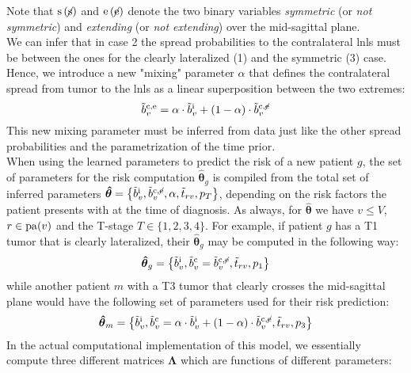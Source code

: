 \documentclass[\relativeRoot/main.tex]{subfiles}
\begin{document}
Note that $\text{s} \, (\centernot{\text{s}})$ and $\text{e} \, (\centernot{\text{e}})$ denote the two binary variables \emph{symmetric} (or \emph{not symmetric}) and \emph{extending} (or \emph{not extending}) over the mid-sagittal plane. \\
We can infer that in case 2 the spread probabilities to the contralateral \glspl{lnl} must be between the ones for the clearly lateralized (1) and the symmetric (3) case. Hence, we introduce a new "mixing" parameter $\alpha$ that defines the contralateral spread from tumor to the \glspl{lnl} as a linear superposition between the two extremes:
%
\begin{equation}
    \Tilde{b}_v^{\text{c} , \text{e}} = \alpha \cdot \Tilde{b}_v^\text{i} + (1 - \alpha) \cdot \Tilde{b}_v^{\text{c} , \centernot{\text{e}}}
\end{equation}
%
This new mixing parameter must be inferred from data just like the other spread probabilities and the parametrization of the time prior. \\
When using the learned parameters to predict the risk of a new patient $g$, the set of parameters for the risk computation $\boldsymbol{\hat{\theta}}_g$ is compiled from the total set of inferred parameters $\boldsymbol{\hat{\theta}} = \big\{ \Tilde{b}_v^\text{i} , \Tilde{b}_v^{\text{c} , \centernot{\text{e}}} , \alpha, \Tilde{t}_{rv}, p_T \big\}$, depending on the risk factors the patient presents with at the time of diagnosis. As always, for $\boldsymbol{\hat{\theta}}$ we have $v \leq V$, $r \in \operatorname{pa}(v)$ and the T-stage $T \in \{ 1, 2, 3, 4 \}$. For example, if patient $g$ has a T1 tumor that is clearly lateralized, their $\boldsymbol{\hat{\theta}}_g$ may be computed in the following way:
%
\begin{equation}
    \boldsymbol{\hat{\theta}}_g = \left\{ \tilde{b}_v^\text{i} , \tilde{b}_v^\text{c} = \tilde{b}_v^{\text{c}, \centernot{\text{e}}} , \tilde{t}_{rv} , p_1 \right\}
\end{equation}
%
while another patient $m$ with a T3 tumor that clearly crosses the mid-sagittal plane would have the following set of parameters used for their risk prediction:
%
\begin{equation}
    \boldsymbol{\hat{\theta}}_m = \left\{ \tilde{b}_v^\text{i} , \tilde{b}_v^\text{c} = \alpha \cdot \Tilde{b}_v^\text{i} + (1 - \alpha) \cdot \Tilde{b}_v^{\text{c} , \centernot{\text{e}}} , \tilde{t}_{rv} , p_3 \right\}
\end{equation}
%
In the actual computational implementation of this model, we essentially compute three different matrices $\boldsymbol{\Lambda}$ which are functions of different parameters:
\end{document}
